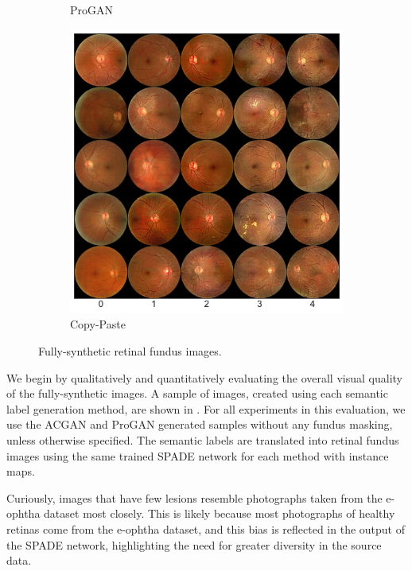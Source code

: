 \begin{figure}[h]
\begin{subfigure}{0.31\textwidth}
        \caption{ProGAN}
        \label{fig:generated_retinas_progan}
    \end{subfigure}
    \begin{subfigure}{0.31\textwidth}
        \centering
        \includegraphics[width=\linewidth]{evaluation/figs/copypaste_retina_sample.pdf}
        \caption{Copy-Paste}
        \label{fig:generated_retinas_copypaste}
    \end{subfigure}
    \caption{Fully-synthetic retinal fundus images.}
    \label{fig:generated_retinas}
\end{figure}

We begin by qualitatively and quantitatively evaluating the overall visual quality of the fully-synthetic images.
A sample of images, created using each semantic label generation method, are shown in .
For all experiments in this evaluation, we use the ACGAN and ProGAN generated samples without any fundus masking, unless otherwise specified.
The semantic labels are translated into retinal fundus images using the same trained SPADE network for each method with instance maps.

Curiously, images that have few lesions resemble photographs taken from the e-ophtha dataset most closely.
This is likely because most photographs of healthy retinas come from the e-ophtha dataset, and this bias is reflected in the output of the SPADE network, highlighting the need for greater diversity in the source data.

